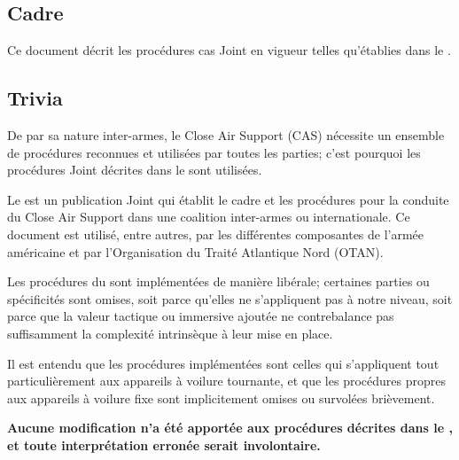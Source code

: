 
%

\begin{imini}
\subsection*{Cadre}

\vfil

Ce document décrit les procédures \gls{cas} Joint en vigueur telles qu'établies dans le \jp{}.

\vfill

\subsection*{Trivia}

\vfil

De par sa nature inter-armes, le Close Air Support (CAS) nécessite un ensemble de procédures reconnues et utilisées par toutes les parties; c'est pourquoi les procédures Joint décrites dans le \jp{} sont utilisées.

\vfil

Le \jp{} est un publication Joint qui établit le cadre et les procédures pour la conduite du Close Air Support dans une coalition inter-armes ou internationale. Ce document est utilisé, entre autres, par les différentes composantes de l'armée américaine et par l'Organisation du Traité Atlantique Nord (OTAN).

\vfil

Les procédures du \jp{} sont implémentées de manière libérale; certaines parties ou spécificités sont omises, soit parce qu'elles ne s'appliquent pas à notre niveau, soit parce que la valeur tactique ou immersive ajoutée ne contrebalance pas suffisamment la complexité intrinsèque à leur mise en place.

\vfil

Il est entendu que les procédures implémentées sont celles qui s'appliquent tout particulièrement aux appareils à voilure tournante, et que les procédures propres aux appareils à voilure fixe sont implicitement omises ou survolées brièvement.

\vfil

\textbf{Aucune modification n'a été apportée aux procédures décrites dans le \jp{}, et toute interprétation erronée serait involontaire.}
\end{imini}
